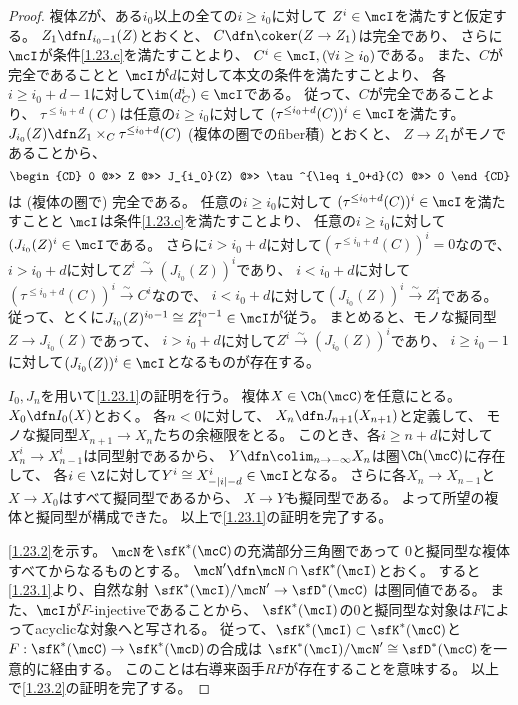 \documentclass[uplatex,dvipdfmx]{jsarticle}
\begin{document}
\begin{proof}
  複体\(Z\)が、ある\(i_0\)以上の全ての\(i\geq i_0\)に対して
  \(Z^i\in \mcI\)を満たすと仮定する。
  \(Z_1 \dfn I_{i_0-1}(Z)\)とおくと、
  \(C\dfn \coker(Z\to Z_1)\)は完全であり、
  さらに\(\mcI\)が条件\ref{1.23.c}を満たすことより、
  \(C^i\in \mcI,(\forall i \geq i_0)\)である。
  また、\(C\)が完全であることと
  \(\mcI\)が\(d\)に対して本文の条件\cite[(1.7.6)]{kashiwara2002sheaves}を満たすことより、
  各\(i \geq i_0+d-1\)に対して\(\im(d_C^i) \in \mcI\)である。
  従って、\(C\)が完全であることより、
  \(\tau^{\leq i_0+d}(C)\)は任意の\(i \geq i_0\)に対して
  \((\tau^{\leq i_0+d}(C))^i\in \mcI\)を満たす。
  \(J_{i_0}(Z)\dfn Z_1\times_C\tau^{\leq i_0+d}(C)\)
  (複体の圏でのfiber積) とおくと、
  \(Z\to Z_1\)がモノであることから、
  \[
  \begin{CD}
    0 @>>> Z @>>> J_{i_0}(Z) @>>> \tau^{\leq i_0+d}(C) @>>> 0
  \end{CD}
  \]
  は (複体の圏で) 完全である。
  任意の\(i \geq i_0\)に対して
  \((\tau^{\leq i_0+d}(C))^i\in \mcI\)を満たすことと
  \(\mcI\)は条件\ref{1.23.c}を満たすことより、
  任意の\(i\geq i_0\)に対して\((J_{i_0}(Z)^i\in \mcI\)である。
  さらに\(i > i_0+d\)に対して\((\tau^{\leq i_0+d}(C))^i=0\)なので、
  \(i > i_0+d\)に対して\(Z^i\xrightarrow{\sim}(J_{i_0}(Z))^i\)であり、
  \(i < i_0+d\)に対して\((\tau^{\leq i_0+d}(C))^i\xrightarrow{\sim}C^i\)なので、
  \(i < i_0+d\)に対して\((J_{i_0}(Z))^i\xrightarrow{\sim}Z_1^i\)である。
  従って、とくに\(J_{i_0}(Z)^{i_0-1}\cong Z_1^{i_0-1}\in \mcI\)が従う。
  まとめると、モノな擬同型\(Z\to J_{i_0}(Z)\)であって、
  \(i > i_0+d\)に対して\(Z^i\xrightarrow{\sim}(J_{i_0}(Z))^i\)であり、
  \(i \geq i_0-1\)に対して\((J_{i_0}(Z))^i \in \mcI\)となるものが存在する。

  \(I_0,J_n\)を用いて\ref{1.23.1}の証明を行う。
  複体\(X\in \Ch(\mcC)\)を任意にとる。
  \(X_0\dfn I_0(X)\)とおく。
  各\(n < 0\)に対して、
  \(X_n\dfn J_{n+1}(X_{n+1})\)と定義して、
  モノな擬同型\(X_{n+1}\to X_n\)たちの余極限をとる。
  このとき、各\(i\geq n+d\)に対して\(X_n^i \to X_{n-1}^i\)は同型射であるから、
  \(Y \dfn \colim_{n\to -\infty}X_n\)は圏\(\Ch(\mcC)\)に存在して、
  各\(i\in \Z\)に対して\(Y^i\cong X_{-|i|-d}^i\in \mcI\)となる。
  さらに各\(X_n\to X_{n-1}\)と\(X\to X_0\)はすべて擬同型であるから、
  \(X\to Y\)も擬同型である。
  よって所望の複体と擬同型が構成できた。
  以上で\ref{1.23.1}の証明を完了する。

  \ref{1.23.2}を示す。
  \(\mcN\)を\(\sfK^*(\mcC)\)の充満部分三角圏であって
  \(0\)と擬同型な複体すべてからなるものとする。
  \(\mcN'\dfn \mcN \cap \sfK^*(\mcI)\)とおく。
  すると\ref{1.23.1}より、自然な射
  \(\sfK^*(\mcI)/\mcN' \to \sfD^*(\mcC)\)
  は圏同値である。
  また、\(\mcI\)が\(F\)-injectiveであることから、
  \(\sfK^*(\mcI)\)の\(0\)と擬同型な対象は\(F\)によってacyclicな対象へと写される。
  従って、\(\sfK^*(\mcI) \subset \sfK^*(\mcC)\)と
  \(F:\sfK^*(\mcC)\to \sfK^*(\mcD)\)の合成は
  \(\sfK^*(\mcI)/\mcN'\cong \sfD^*(\mcC)\)を一意的に経由する。
  このことは右導来函手\(RF\)が存在することを意味する。
  以上で\ref{1.23.2}の証明を完了する。


\end{proof}
\end{document}
